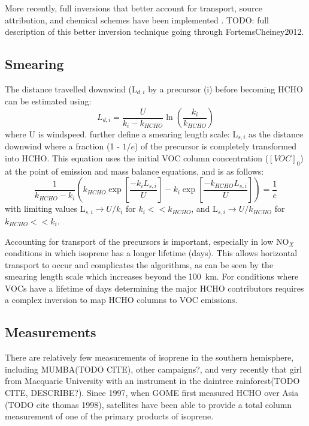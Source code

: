     More recently, full inversions that better account for transport, source attribution, and chemical schemes have been implemented \citep{FortemsCheiney2012}.
    TODO: full description of this better inversion technique going through FortemsCheiney2012.
  
  \subsection{Smearing}
  \label{ch1:sec:smearing}
    The distance travelled downwind (L$_{d,i}$ by a precursor (i) before becoming HCHO can be estimated using:
    \begin{equation*}
      L_{d,i} = \frac{U}{k_i - k_{HCHO}} \ln{ \left( \frac{k_i}{k_{HCHO}} \right) }
    \end{equation*}
    where U is windspeed.
    \citet{Palmer2003} further define a smearing length scale: L$_{s,i}$ as the distance downwind where a fraction (1 - $1/e$) of the precursor is completely transformed into HCHO.
    This equation uses the initial VOC column concentration ($[VOC]_0$) at the point of emission and mass balance equations, and is as follows:
    \begin{equation}
      \frac{1}{k_{HCHO}-k_i} \left( k_{HCHO} \exp{ \left[ \frac{-k_i L_{s,i}}{U} \right]} -k_i \exp{ \left[ \frac{-k_{HCHO} L_{s,i}}{U} \right]} \right) = \frac{1}{e} 
    \end{equation}
    with limiting values L$_{s,i} \rightarrow U/k_i$ for $k_i << k_{HCHO}$, and L$_{s,i} \rightarrow U/k_{HCHO}$ for $k_{HCHO} << k_i$.  
    
    Accounting for transport of the precursors is important, especially in low NO$_X$ conditions in which isoprene has a longer lifetime (days).
    This allows horizontal transport to occur and complicates the algorithms, as can be seen by the smearing length scale which increases beyond the 100~km.
    For conditions where VOCs have a lifetime of days determining the major HCHO contributors requires a complex inversion to map HCHO columns to VOC emissions.
    
  \subsection{Measurements}
  
    There are relatively few measurements of isoprene in the southern hemisphere, including MUMBA(TODO CITE), other campaigns?, and very recently that girl from Macquarie University with an instrument in the daintree rainforest(TODO CITE, DESCRIBE?).
    Since 1997, when GOME first measured HCHO over Asia (TODO cite thomas 1998), satellites have been able to provide a total column measurement of one of the primary products of isoprene.
    
